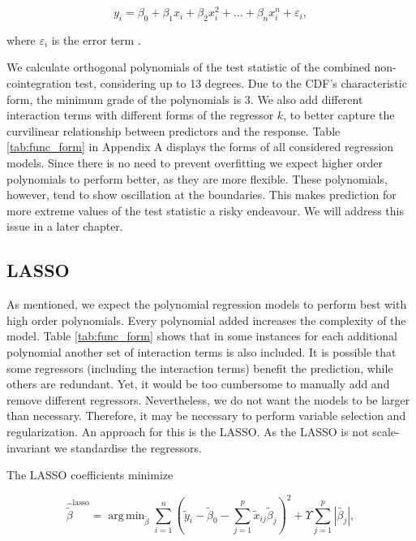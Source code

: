 \documentclass[12pt,a4paper]{article}
\DeclareMathOperator*{\argmin}{arg\,min}
\begin{document}
\begin{equation}
    y_i = \beta_0 + \beta_1 x_i + \beta_2 x_i^2 + ... + \beta_n x_i^n + \varepsilon_i,
\label{eq:7}
\end{equation}

where \(\varepsilon_i\) is the error term \autocite{James_2013}.

We calculate orthogonal polynomials of the test statistic of the
combined non-cointegration test, considering up to 13 degrees. Due to
the \ac{CDF}'s characteristic form, the minimum grade of the polynomials
is 3. We also add different interaction terms with different forms of
the regressor \(k\), to better capture the curvilinear relationship
between predictors and the response. Table \ref{tab:func_form} in
Appendix A displays the forms of all considered regression models. Since
there is no need to prevent overfitting we expect higher order
polynomials to perform better, as they are more flexible. These
polynomials, however, tend to show oscillation at the boundaries. This
makes prediction for more extreme values of the test statistic a risky
endeavour. We will address this issue in a later chapter.

\hypertarget{section}{%
\subsection{\texorpdfstring{\ac{LASSO}}{}}\label{section}}

As mentioned, we expect the polynomial regression models to perform best
with high order polynomials. Every polynomial added increases the
complexity of the model. Table \ref{tab:func_form} shows that in some
instances for each additional polynomial another set of interaction
terms is also included. It is possible that some regressors (including
the interaction terms) benefit the prediction, while others are
redundant. Yet, it would be too cumbersome to manually add and remove
different regressors. Nevertheless, we do not want the models to be
larger than necessary. Therefore, it may be necessary to perform
variable selection and regularization. An approach for this is the
\ac{LASSO}. As the \ac{LASSO} is not scale-invariant we standardise the
regressors.

The \ac{LASSO} coefficients minimize

\begin{equation}
    \widehat{\tilde{\beta}}^{\text{lasso}} = \argmin_{\tilde{\beta}} \sum^n_{i=1} \left( \tilde{y}_i - \tilde{\beta}_0 - \sum^p_{j=1} \tilde{x}_{ij} \tilde{\beta}_j \right)^2 + 
    \Upsilon \sum^p_{j=1} \left|\tilde{\beta_j} \right|,
\label{eq:9}
\end{equation}
\end{document}
